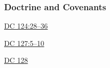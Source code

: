 	\subsubsection{Doctrine and Covenants} %
		\label{BAPTISMDEAD-DC}
	
		
		\begin{compactdesc}
			\item[{\hyperref[DC124-28]{DC 124:28--36}}]
			\item[{\hyperref[DC127-5]{DC 127:5--10}}]
			\item[{\hyperref[DC128]{DC 128}}]
		\end{compactdesc}
		
	
		
		

	
